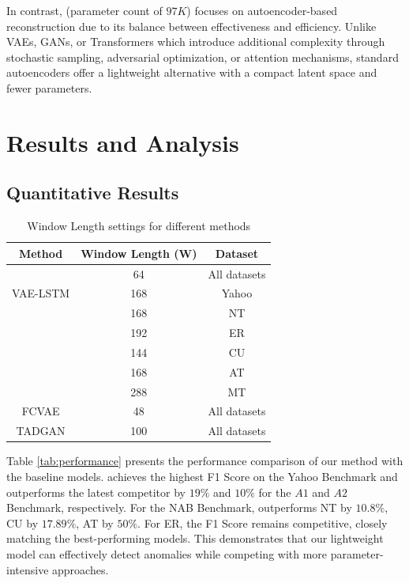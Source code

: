 In contrast, \fname{} (parameter count of $97K$) focuses on autoencoder-based reconstruction due to its balance between effectiveness and efficiency.
Unlike VAEs, GANs, or Transformers which introduce additional complexity through stochastic sampling, adversarial
optimization, or attention mechanisms, standard autoencoders offer a lightweight alternative with a compact latent space
and fewer parameters. 





 


\section{Results and Analysis}
\label{sec:results}
\subsection{Quantitative Results}

\begin{table}
    \centering
    \caption{Window Length settings for different methods}
    \renewcommand{\arraystretch}{1.4} 
    \setlength{\tabcolsep}{8pt} 
    \begin{tabular}{c c c}
    \hline
    \textbf{Method} & \textbf{Window Length (W)} & \textbf{Dataset} \\
    \hline
    \fname{} & 64 & All datasets \\
    \hline
    VAE-LSTM & 168 & Yahoo \\
    & 168 & NT \\ 
    & 192 & ER \\ 
    & 144 & CU \\
    & 168 & AT \\
    & 288 & MT  \\
    \hline
    FCVAE & 48 & All datasets \\
    \hline
    TADGAN & 100 & All datasets \\
    \hline

    \end{tabular}
    \label{tab:W}
\end{table} 
Table \ref{tab:performance} presents the performance comparison of our method with the baseline models. \fname{} achieves the highest F1 Score on the Yahoo Benchmark and outperforms the latest competitor by $19\%$ and $10\%$ for the $A1$ and $A2$ Benchmark, respectively. For the NAB Benchmark, \fname{} outperforms NT by $10.8\%$, CU by $17.89\%$, AT by $50\%$. For ER, the F1 Score remains competitive, closely matching the best-performing models. This demonstrates that our lightweight model can effectively detect anomalies while competing with more parameter-intensive approaches. 

